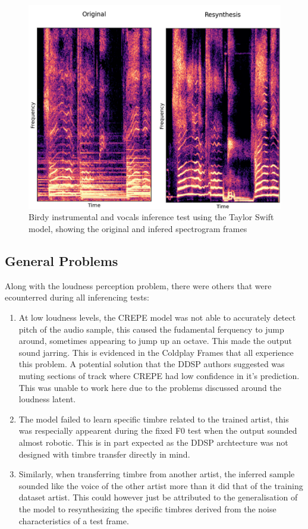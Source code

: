 \begin{figure}[H]
    \centering
    \includegraphics[width=\textwidth]{research/results/Birdy/InferenceWithInstrumentals.png}
    \caption{Birdy instrumental and vocals inference test using the Taylor Swift model, showing the original and infered spectrogram frames}
\end{figure}

\subsection{General Problems}

Along with the loudness perception problem, there were others that were ecounterred during all inferencing tests:

\begin{enumerate}
    \item At low loudness levels, the CREPE model was not able to accurately detect pitch of the audio sample, this caused the fudamental ferquency to jump around, sometimes appearing to jump up an octave. This made the output sound jarring. This is evidenced in the Coldplay Frames that all experience this problem. A potential solution that the DDSP authors suggested was muting sections of track where CREPE had low confidence in it's prediction. This was unable to work here due to the problems discussed around the loudness latent.
    \item The model failed to learn specific timbre related to the trained artist, this was respecially appearent during the fixed F0 test when the output sounded almost robotic. This is in part expected as the DDSP archtecture was not designed with timbre transfer directly in mind.
    \item Similarly, when transferring timbre from another artist, the inferred sample sounded like the voice of the other artist more than it did that of the training dataset artist. This could however just be attributed to the generalisation of the model to resynthesizing the specific timbres derived from the noise characteristics of a test frame.
\end{enumerate}
